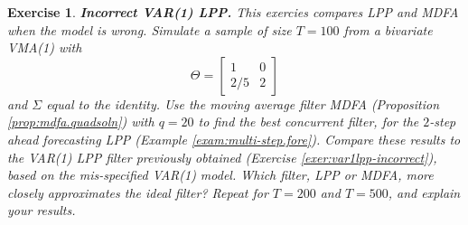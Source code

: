 \documentclass[a4paper]{book}
\newtheorem{Exercise}{Exercise}
\begin{document}
\begin{Exercise} {\bf Incorrect VAR(1) LPP.} \rm
\label{exer:var1lpp-incorrect.2}
 This exercies compares LPP and MDFA when the model is wrong.
  Simulate a sample of size
  $T=100$ from  a bivariate  VMA(1) with
\[
 \Theta = \left[ \begin{array}{cc} 1 & 0 \\ 2/5 & 2 \end{array} \right]
\]
  and $\Sigma$ equal to the identity.  Use the moving average filter
 MDFA  (Proposition \ref{prop:mdfa.quadsoln}) with $q=20$ to find the best
 concurrent filter, for the $2$-step
 ahead forecasting LPP (Example \ref{exam:multi-step.fore}). 
 Compare these results to the 
  VAR(1) LPP filter previously obtained 
 (Exercise \ref{exer:var1lpp-incorrect}), based on the mis-specified
 VAR(1) model.  Which filter, LPP or MDFA, more closely approximates
 the ideal filter?   Repeat for $T=200$ and $T=500$, and explain your results.
\end{Exercise}
\end{document}

